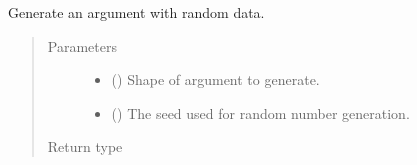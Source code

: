 \documentclass[letterpaper,10pt,english]{sphinxmanual}
\begin{document}
\begin{fulllineitems}
\label{\detokenize{reference/py:migraphx.generate_argument}}
\sphinxAtStartPar
Generate an argument with random data.
\begin{quote}\begin{description}
\item[{Parameters}] \leavevmode\begin{itemize}
\item {} 
\sphinxAtStartPar
{} ({\hyperref[\detokenize{reference/py:migraphx.shape}]{}}) \textendash{} Shape of argument to generate.

\item {} 
\sphinxAtStartPar
{} () \textendash{} The seed used for random number generation.

\end{itemize}

\item[{Return type}] \leavevmode
\sphinxAtStartPar
{\hyperref[\detokenize{reference/py:migraphx.argument}]{}}

\end{description}\end{quote}

\end{fulllineitems}

\end{document}
